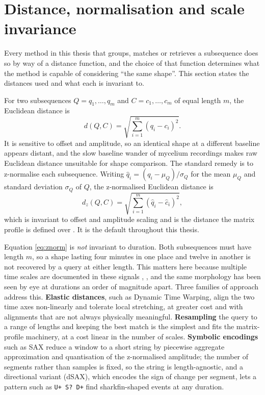 \section{Distance, normalisation and scale invariance}
\label{sec:distance}

Every method in this thesis that groups, matches or retrieves a subsequence does so by way of a distance function, and the choice of that function determines what the method is capable of considering ``the same shape''. This section states the distances used and what each is invariant to.

For two subsequences $Q = q_1,\ldots,q_m$ and $C = c_1,\ldots,c_m$ of equal length $m$, the Euclidean distance is
\begin{equation}
d(Q,C) = \sqrt{\sum_{i=1}^{m}(q_i - c_i)^2}.
\end{equation}
It is sensitive to offset and amplitude, so an identical shape at a different baseline appears distant, and the slow baseline wander of mycelium recordings makes raw Euclidean distance unsuitable for shape comparison. The standard remedy is to z-normalise each subsequence. Writing $\hat{q}_i = (q_i - \mu_Q)/\sigma_Q$ for the mean $\mu_Q$ and standard deviation $\sigma_Q$ of $Q$, the z-normalised Euclidean distance is
\begin{equation}
d_z(Q,C) = \sqrt{\sum_{i=1}^{m}(\hat{q}_i - \hat{c}_i)^2},
\label{eq:znorm}
\end{equation}
which is invariant to offset and amplitude scaling and is the distance the matrix profile is defined over \cite{yeh}. It is the default throughout this thesis.

Equation \eqref{eq:znorm} is \emph{not} invariant to duration. Both subsequences must have length $m$, so a shape lasting four minutes in one place and twelve in another is not recovered by a query at either length. This matters here because multiple time scales are documented in these signals \cite{adamatzky2023}, \cite{dehshibi}, and the same morphology has been seen by eye at durations an order of magnitude apart. Three families of approach address this. \textbf{Elastic distances}, such as Dynamic Time Warping, align the two time axes non-linearly and tolerate local stretching, at greater cost and with alignments that are not always physically meaningful. \textbf{Resampling} the query to a range of lengths and keeping the best match is the simplest and fits the matrix-profile machinery, at a cost linear in the number of scales. \textbf{Symbolic encodings} such as SAX \cite{lin2007sax} reduce a window to a short string by piecewise aggregate approximation and quantisation of the z-normalised amplitude; the number of segments rather than samples is fixed, so the string is length-agnostic, and a directional variant (dSAX), which encodes the sign of change per segment, lets a pattern such as \texttt{U+ S? D+} find sharkfin-shaped events at any duration.

